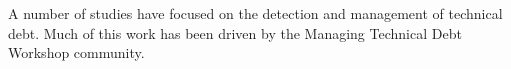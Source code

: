 A number of studies have focused on the detection and management of technical debt. Much of this work has been driven by the Managing Technical Debt Workshop community. 








